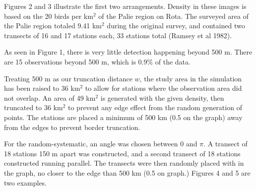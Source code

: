 \documentclass[12pt]{article}
\begin{document}
Figures 2 and 3 illustrate the first two arrangements. Density in these images is based on the 20 birds per km$^2$ of the Palie region on Rota. The surveyed area of the Palie region totaled 9.41 km$^2$ during the original survey, and contained two transects of 16 and 17 stations each, 33 stations total (Ramsey et al 1982).

As seen in Figure 1, there is very little detection happening beyond 500 m. There are 15 observations beyond 500 m, which is 0.9\% of the data. 

Treating 500 m as our truncation distance $w$, the study area in the simulation has been raised to 36 km$^2$ to allow for stations where the observation area did not overlap. An area of 49 km$^2$ is generated with the given density, then truncated to 36 km$^2$ to prevent any edge effect from the random generation of points. The stations are placed a minimum of 500 km (0.5 on the graph) away from the edges to prevent border truncation. 

For the random-systematic, an angle was chosen between $0$ and $\pi$. A transect of 18 stations 150 m apart was constructed, and a second transect of 18 stations constructed running parallel. The transects were then randomly placed with in the graph, no closer to the edge than 500 km (0.5 on graph.) Figures 4 and 5 are two examples.
\end{document}
